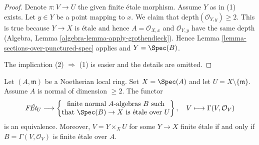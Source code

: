 \begin{proof}
Denote $\pi : V \to U$ the given finite \'etale morphism.
Assume $Y$ as in (1) exists.
Let $y \in Y$ be a point mapping to $x$. We claim that
$\text{depth}(\mathcal{O}_{Y, y}) \geq 2$.
This is true because $Y \to X$ is \'etale and hence
$A = \mathcal{O}_{X, x}$ and $\mathcal{O}_{Y, y}$ have
the same depth (Algebra, Lemma \ref{algebra-lemma-apply-grothendieck}).
Hence Lemma \ref{lemma-sections-over-punctured-spec}
applies and $Y = \Spec(B)$.

\medskip\noindent
The implication (2) $\Rightarrow$ (1) is easier and the
details are omitted.
\end{proof}

\begin{lemma}
\label{lemma-reformulate-purity-normal}
Let $(A, \mathfrak m)$ be a Noetherian local ring. Set $X = \Spec(A)$
and let $U = X \setminus \{\mathfrak m\}$. Assume $A$ is normal
of dimension $\geq 2$. The functor
$$
\textit{F\'Et}_U \longrightarrow
\left\{
\begin{matrix}
\text{finite normal }A\text{-algebras }B\text{ such} \\
\text{that }\Spec(B) \to X\text{ is \'etale over }U
\end{matrix}
\right\},
\quad
V \longmapsto \Gamma(V, \mathcal{O}_V)
$$
is an equivalence. Moreover, $V = Y \times_X U$ for some $Y \to X$
finite \'etale if and only if $B = \Gamma(V, \mathcal{O}_V)$
is finite \'etale over $A$.
\end{lemma}

